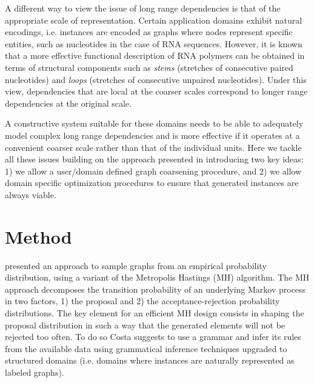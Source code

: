 \documentclass{article}
\begin{document}
A different way to view the issue of long range dependencies is that of the
appropriate scale of representation. Certain application domains exhibit
natural encodings, i.e. instances are encoded as graphs where nodes represent
specific entities, such as nucleotides in the case of RNA sequences. However,
it is known that a more effective functional description of RNA polymers can
be obtained in terms of structural components such as {\em stems} (stretches
of consecutive paired nucleotides) and {\em loops} (stretches of consecutive
unpaired nucleotides). Under this view, dependencies that are local at the
coarser scales correspond to longer range dependencies at the original scale.

A constructive system suitable for these domains needs to be able to
adequately model complex long range dependencies and is more effective if it
operates at a convenient coarser scale rather than that of the individual
units. Here we tackle all these issues building on the approach presented in
\cite{costa16} introducing two key ideas: 1) we allow a user/domain defined graph
coarsening procedure,
and 2) we allow domain specific optimization procedures to ensure that
generated instances are always viable.


\section{Method}

\cite{costa16} presented an approach to sample graphs from an empirical
probability distribution, using a variant of the Metropolis Hastings (MH)
algorithm. The MH approach decomposes the transition probability of an
underlying  Markov process in two factors, 1) the proposal  and 2) the
acceptance-rejection probability distributions. The key element for an
efficient MH design consists in shaping the proposal distribution  in such a
way that the generated elements will not be rejected too often. To do so Costa
suggests to use a grammar and infer its rules from the available data using
grammatical inference techniques upgraded to structured domains (i.e. domains
where instances are naturally represented as labeled graphs).
\end{document}
